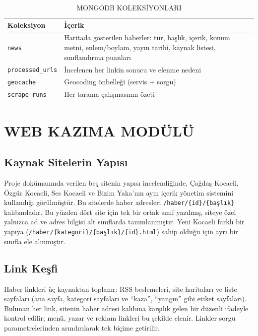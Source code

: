\documentclass[conference,a4paper]{IEEEtran}
\begin{document}
\begin{table}[!t]
\caption{MONGODB KOLEKSİYONLARI}
\label{tab:koleksiyon}
\centering\footnotesize
\begin{tabular}{@{}p{}p{}@{}}
\toprule
\textbf{Koleksiyon} & \textbf{İçerik} \\
\midrule
\texttt{news} & Haritada gösterilen haberler: tür, başlık, içerik, konum metni,
enlem/boylam, yayın tarihi, kaynak listesi, sınıflandırma puanları \\
\texttt{processed\_urls} & İncelenen her linkin sonucu ve elenme nedeni \\
\texttt{geocache} & Geocoding önbelleği (servis + sorgu) \\
\texttt{scrape\_runs} & Her tarama çalışmasının özeti \\
\bottomrule
\end{tabular}
\end{table}

\section{WEB KAZIMA MODÜLÜ}\label{sec:kazima}

\subsection{Kaynak Sitelerin Yapısı}
Proje dokümanında verilen beş sitenin yapısı incelendiğinde, Çağdaş Kocaeli,
Özgür Kocaeli, Ses Kocaeli ve Bizim Yaka'nın aynı içerik yönetim sistemini
kullandığı görülmüştür. Bu sitelerde haber adresleri
\texttt{/haber/\{id\}/\{başlık\}} kalıbındadır. Bu yüzden dört site için tek bir
ortak sınıf yazılmış, siteye özel yalnızca ad ve adres bilgisi alt sınıflarda
tanımlanmıştır. Yeni Kocaeli farklı bir yapıya
(\texttt{/haber/\{kategori\}/\{başlık\}/\{id\}.html}) sahip olduğu için ayrı bir
sınıfla ele alınmıştır.

\subsection{Link Keşfi}
Haber linkleri üç kaynaktan toplanır: RSS beslemeleri, site haritaları ve liste
sayfaları (ana sayfa, kategori sayfaları ve ``kaza'', ``yangın'' gibi etiket
sayfaları). Bulunan her link, sitenin haber adresi kalıbına karşılık gelen bir
düzenli ifadeyle kontrol edilir; menü, yazar ve reklam linkleri bu şekilde
elenir. Linkler sorgu parametrelerinden arındırılarak tek biçime getirilir.
\end{document}
